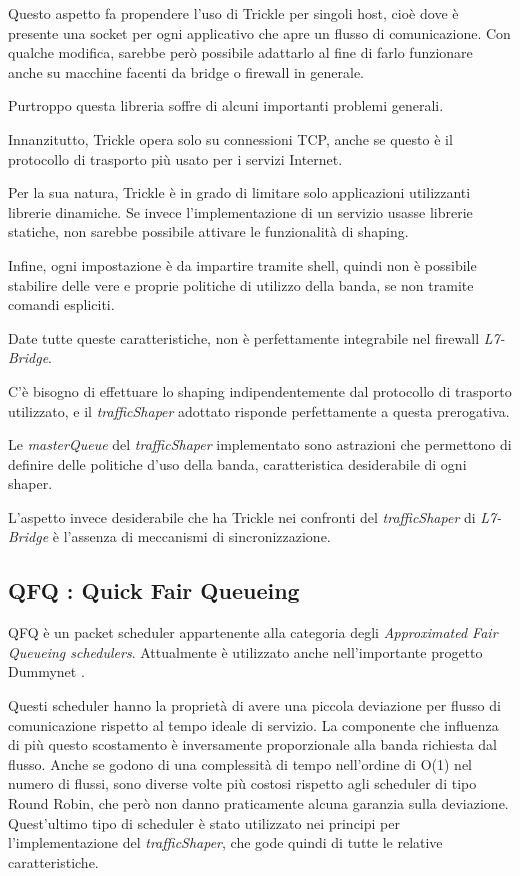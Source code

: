 Questo aspetto fa propendere l'uso di Trickle per singoli host, cioè dove è presente una socket per ogni applicativo che apre un flusso di comunicazione. Con qualche modifica, sarebbe però possibile adattarlo al fine di farlo funzionare anche su macchine facenti da bridge o firewall in generale.

Purtroppo questa libreria soffre di alcuni importanti problemi generali.

Innanzitutto, Trickle opera solo su connessioni TCP, anche se questo è il protocollo di trasporto più usato per i servizi Internet.

Per la sua natura, Trickle è in grado di limitare solo applicazioni utilizzanti librerie dinamiche. Se invece l'implementazione di un servizio usasse librerie statiche, non sarebbe possibile attivare le funzionalità di shaping.

Infine, ogni impostazione è da impartire tramite shell, quindi non è possibile stabilire delle vere e proprie politiche di utilizzo della banda, se non tramite comandi espliciti.

Date tutte queste caratteristiche, non è perfettamente integrabile nel firewall \emph{L7-Bridge}.

C'è bisogno di effettuare lo shaping indipendentemente dal protocollo di trasporto utilizzato, e il \emph{trafficShaper} adottato risponde perfettamente a questa prerogativa.

Le \emph{masterQueue} del \emph{trafficShaper} implementato sono astrazioni che permettono di definire delle politiche d'uso della banda, caratteristica desiderabile di ogni shaper.

L'aspetto invece desiderabile che ha Trickle nei confronti del \emph{trafficShaper} di \emph{L7-Bridge} è l'assenza di meccanismi di sincronizzazione.

\subsection{QFQ : Quick Fair Queueing}

QFQ \cite{qfq} è un packet scheduler appartenente alla categoria degli \emph{Approximated Fair Queueing schedulers}. Attualmente è utilizzato anche nell'importante progetto Dummynet \cite{dummynet}.

Questi scheduler hanno la proprietà di avere una piccola deviazione per flusso di comunicazione rispetto al tempo ideale di servizio. La componente che influenza di più questo scostamento è inversamente proporzionale alla banda richiesta dal flusso. Anche se godono di una complessità di tempo nell'ordine di O(1) nel numero di flussi, sono diverse volte più costosi rispetto agli scheduler di tipo Round Robin, che però non danno praticamente alcuna garanzia sulla deviazione. Quest'ultimo tipo di scheduler è stato utilizzato nei principi per l'implementazione del \emph{trafficShaper}, che gode quindi di tutte le relative caratteristiche.

